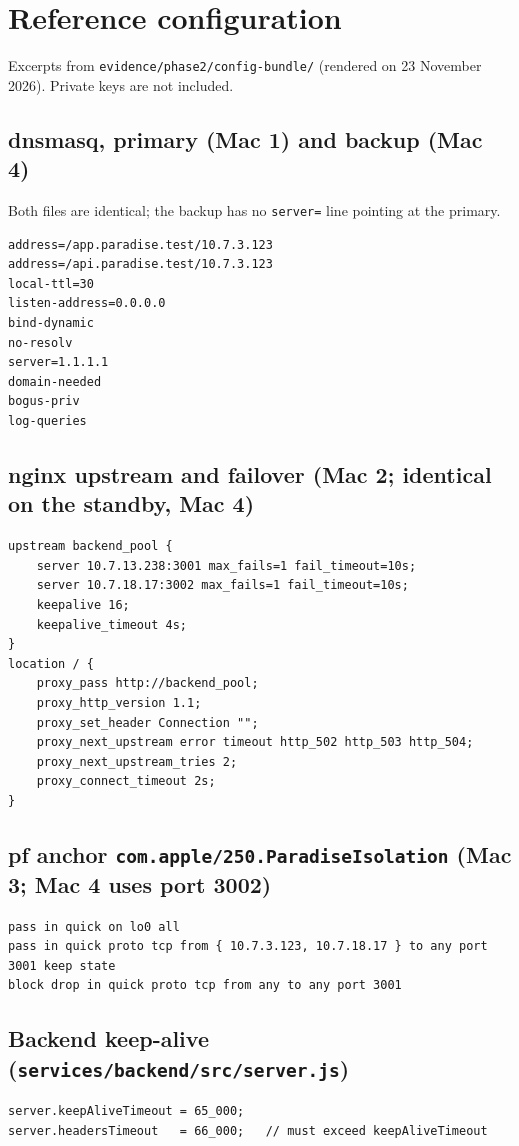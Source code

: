 \documentclass[11pt,a4paper]{article}
\begin{document}
\appendix
\section{Reference configuration}
Excerpts from \texttt{evidence/phase2/config-bundle/} (rendered on 23 November 2026). Private keys
are not included.

\subsection{dnsmasq, primary (Mac 1) and backup (Mac 4)}
Both files are identical; the backup has no \texttt{server=} line pointing at the primary.
\begin{lstlisting}
address=/app.paradise.test/10.7.3.123
address=/api.paradise.test/10.7.3.123
local-ttl=30
listen-address=0.0.0.0
bind-dynamic
no-resolv
server=1.1.1.1
domain-needed
bogus-priv
log-queries
\end{lstlisting}

\subsection{nginx upstream and failover (Mac 2; identical on the standby, Mac 4)}
\begin{lstlisting}
upstream backend_pool {
    server 10.7.13.238:3001 max_fails=1 fail_timeout=10s;
    server 10.7.18.17:3002 max_fails=1 fail_timeout=10s;
    keepalive 16;
    keepalive_timeout 4s;
}
location / {
    proxy_pass http://backend_pool;
    proxy_http_version 1.1;
    proxy_set_header Connection "";
    proxy_next_upstream error timeout http_502 http_503 http_504;
    proxy_next_upstream_tries 2;
    proxy_connect_timeout 2s;
}
\end{lstlisting}

\subsection{pf anchor \texttt{com.apple/250.ParadiseIsolation} (Mac 3; Mac 4 uses port 3002)}
\begin{lstlisting}
pass in quick on lo0 all
pass in quick proto tcp from { 10.7.3.123, 10.7.18.17 } to any port 3001 keep state
block drop in quick proto tcp from any to any port 3001
\end{lstlisting}

\subsection{Backend keep-alive (\texttt{services/backend/src/server.js})}
\begin{lstlisting}
server.keepAliveTimeout = 65_000;
server.headersTimeout   = 66_000;   // must exceed keepAliveTimeout
\end{lstlisting}
\end{document}
